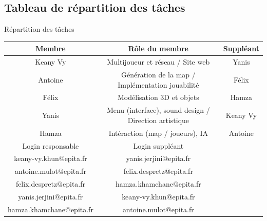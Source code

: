 \documentclass[
	article,			%
	11pt,				%
	oneside,			%
	a4paper,			%
	chapter=TITLE,
	french,			%
	sumario=tradicional
	]{base_nt}
\begin{document}
\newpage

\subsection{Tableau de répartition des tâches}

\begin{quadro}
	\caption{Répartition des tâches}
	\centering
	\begin{tabular}{|c|c|c|}
		\hline
		Membre   & Rôle du membre & Suppléant  \\
		\hline
		Keany Vy & Multijoueur et réseau / Site web & Yanis \\
		Antoine & Génération de la map / Implémentation jouabilité & Félix \\
		Félix & Modélisation 3D et objets & Hamza \\
            Yanis & Menu (interface), sound design / Direction artistique  & Keany Vy \\
            Hamza & Intéraction (map / joueurs), IA  & Antoine \\
		\hline
		Login responsable &  Login suppléant  & \\
            \hline
            keany-vy.khun@epita.fr & yanis.jerjini@epita.fr & \\
            antoine.mulot@epita.fr & felix.despretz@epita.fr & \\
            felix.despretz@epita.fr & hamza.khamchane@epita.fr & \\
            yanis.jerjini@epita.fr & keany-vy.khun@epita.fr & \\
            hamza.khamchane@epita.fr & antoine.mulot@epita.fr & \\
            \hline
	\end{tabular}
\end{quadro}
\end{document}

